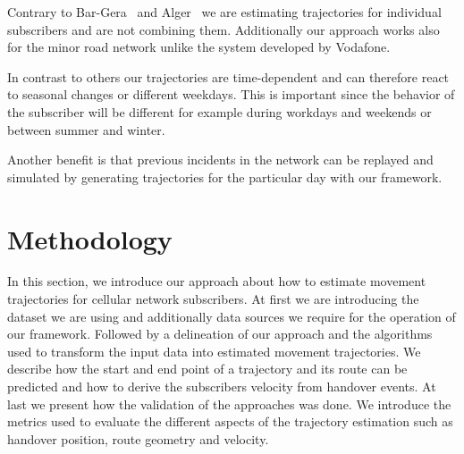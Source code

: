 \documentclass[twocolumn]{bmcart}%
\begin{document}
Contrary to Bar-Gera~\cite{Bar2007} and Alger~\cite{Alger2004} we are estimating trajectories for individual subscribers and are not combining them. Additionally our approach works also for the minor road network unlike the system developed by Vodafone.

In contrast to others our trajectories are time-dependent and can therefore react to seasonal changes or different weekdays. This is important since the behavior of the subscriber will be different for example during workdays and weekends or between summer and winter.

Another benefit is that previous incidents in the network can be replayed and simulated by generating trajectories for the particular day with our framework.


\section*{Methodology}

In this section, we introduce our approach about how to estimate movement trajectories for cellular network subscribers. At first we are introducing the dataset we are using and additionally data sources we require for the operation of our framework. Followed by a delineation of our approach and the algorithms used to transform the input data into estimated movement trajectories. We describe how the start and end point of a trajectory and its route can be predicted and how to derive the subscribers velocity from handover events. At last we present how the validation of the approaches was done. We introduce the metrics used to evaluate the different aspects of the trajectory estimation such as handover position, route geometry and velocity. 

\end{document}
